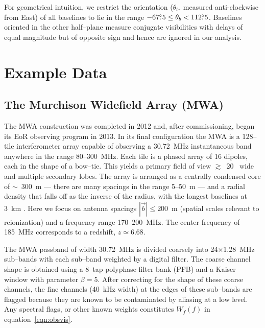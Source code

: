 \documentclass[preprint2,iop,numberedappendix]{emulateapj}
\begin{document}
For geometrical intuition, we restrict the orientation ($\theta_b$, measured anti-clockwise from East) of all baselines to lie in the range $-67\mbox{$.\!\!^\circ$} 5 \leq \theta_b < 112\mbox{$.\!\!^\circ$} 5$. Baselines oriented in the other half--plane measure conjugate visibilities with delays of equal magnitude but of opposite sign and hence are ignored in our analysis.

\section{Example Data}\label{sec:instrument}

\subsection{The Murchison Widefield Array (MWA)}

The MWA construction was completed in 2012 and, after commissioning, began its EoR observing program in 2013. In its final configuration the MWA is a 128--tile interferometer array capable of observing a 30.72~MHz instantaneous band anywhere in the range 80--300~MHz. Each tile is a phased array of 16 dipoles, each in the shape of a bow--tie. This yields a primary field of view $\gtrsim$~20\arcdeg~ wide and multiple secondary lobes. The array is arranged as a centrally condensed core of $\sim$~300~m --- there are many spacings in the range 5--50~m --- and a radial density that falls off as the inverse of the radius, with the longest baselines at 3~km \citep{bea12}. Here we focus on antenna spacings $|\vec{b}| \le 200$~m (spatial scales relevant to reionization) and a frequency range 170--200~MHz. The center frequency of 185~MHz corresponds to a redshift, $z\simeq 6.68$.

The MWA passband of width 30.72~MHz is divided coarsely into 24$\times$1.28~MHz sub--bands with each sub--band weighted by a digital filter. The coarse channel shape is obtained using a 8--tap polyphase filter bank (PFB) and a Kaiser window with parameter $\beta=5$. After correcting for the shape of these coarse channels, the fine channels (40~kHz width) at the edges of these sub--bands are flagged because they are known to be contaminated by aliasing at a low level. Any spectral flags, or other known weights constitutes $W_f(f)$ in equation~\ref{eqn:obsvis}. 

\end{document}

